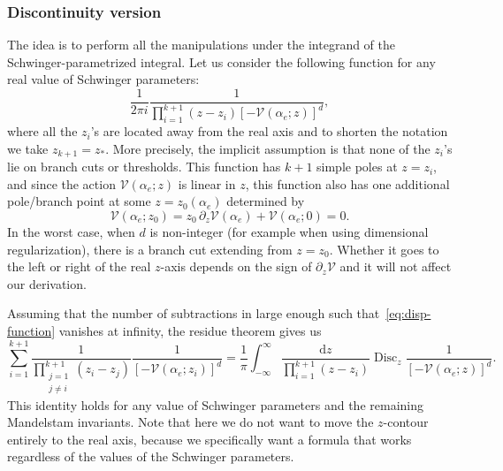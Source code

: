 \documentclass[12pt]{article}
\numberwithin{figure}{section}
\DeclareMathOperator{\Disc}{Disc}
\def \be {\begin{equation}}
\def \ee {\end{equation}}
\def \d {\mathrm{d}}
\def \V {\mathcal{V}}
\begin{document}
    \subsubsection{Discontinuity version}
    The idea is to perform all the manipulations under the integrand of the Schwinger-parametrized integral. Let us consider the following function for any real value of Schwinger parameters:
	\be\label{eq:disp-function}
	\frac{1}{2\pi i} \frac{1}{\prod_{i=1}^{k+1} (z - z_i) [-\V(\alpha_e; z)]^d},
	\ee
    where all the $z_i$'s are located away from the real axis and to shorten the notation we take $z_{k+1} = z_\ast$. More precisely, the implicit assumption is that none of the $z_i$'s lie on branch cuts or thresholds. This function has $k{+}1$ simple poles at $z=z_i$, and since the action $\V(\alpha_e;z)$ is linear in $z$, this function also has one additional pole/branch point at some $z = z_0(\alpha_e)$ determined by
    \be
    \V(\alpha_e; z_0) = z_0\, \partial_z \V(\alpha_e) + \V(\alpha_e; 0) = 0.
    \ee
    In the worst case, when $d$ is non-integer (for example when using dimensional regularization), there is a branch cut extending from $z = z_0$. Whether it goes to the left or right of the real $z$-axis depends on the sign of $\partial_z \V$ and it will not affect our derivation.
    
    Assuming that the number of subtractions in large enough such that~\eqref{eq:disp-function} vanishes at infinity, the residue theorem gives us
    \be\label{eq:id1}
    \sum_{i=1}^{k+1} \frac{1}{\prod_{\substack{j=1\\ j\neq i}}^{k+1} (z_i - z_j)} \frac{1}{[-\V(\alpha_e; z_i)]^d} = \frac{1}{\pi} \int_{-\infty}^{\infty} \frac{\d z}{\prod_{i=1}^{k+1}(z - z_i)} \Disc_z \frac{1}{[-\V(\alpha_e; z)]^d}. 
    \ee
    This identity holds for any value of Schwinger parameters and the remaining Mandelstam invariants. Note that here we do not want to move the $z$-contour entirely to the real axis, because we specifically want a formula that works regardless of the values of the Schwinger parameters.
    
\end{document}
